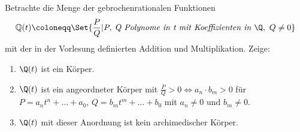 \begin{prob}
  Betrachte die Menge der gebrochenrationalen Funktionen
  \begin{equation*}
    \mathbb{Q}(t)
    \coloneqq
    \Set{\frac{P}{Q} | \textit{P, Q Polynome in t mit Koeffizienten in } \Q, \ Q
      \neq 0}
  \end{equation*}
  mit der in der Vorlesung definierten Addition und Multiplikation. Zeige:
  \begin{enumerate}[label=(\alph*)]
  \item $\Q(t)$ ist ein Körper.
  \item $\Q(t)$ ist ein angeordneter Körper mit
    $\frac{P}{Q}>0 \iff a_n\cdot b_m>0$ für $P = a_nt^n + \ldots + a_0$,
    $Q = b_mt^m + \ldots + b_0$ mit $a_n \neq 0$ und $b_m \neq 0$.
  \item $\Q(t)$ mit dieser Anordnung ist kein archimedischer Körper.
  \end{enumerate}
\end{prob}
